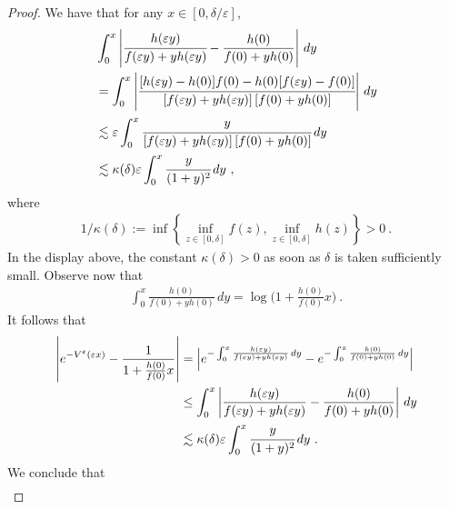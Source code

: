 \documentclass[reqno, 12pt, a4paper]{amsart}
\theoremstyle{plain}
\theoremstyle{definition}
\begin{document}
\begin{proof}
We have that for any $x \in [0,\delta/\varepsilon]$, 
\begin{equation}
\begin{split}
& \int_{0}^x \left\vert \cfrac{h(\varepsilon y)}{f(\varepsilon y) + y h(\varepsilon y)} - \frac{h(0)}{f(0)+y h(0)} \right\vert \, dy \\
&= \int_0^x \left\vert \cfrac{ [ h(\varepsilon y) -h(0)] f(0) - h(0) [ f(\varepsilon y) -f(0)] }{[ f(\varepsilon y) + y h(\varepsilon y)] \, [ f(0)+y h(0)] } \right\vert \, dy \\
& \lesssim \varepsilon  \int_0^x  \cfrac{y}{[ f(\varepsilon y) + y h(\varepsilon y)] \, [ f(0)+y h(0)] } \, dy \\
& \lesssim  \kappa (\delta) \varepsilon  \int_0^x  \cfrac{y}{(1+y)^2} \, dy \ ,
\end{split}
\end{equation}
where 
\begin{equation}
\begin{split}
1/ \kappa(\delta) := \inf\left\{ \inf_{z \in [0,\delta]} f(z) , \inf_{z \in [0,\delta]} h(z) \right\} > 0 \ .
\end{split}
\end{equation}
In the display above, the constant $\kappa (\delta)>0$ as soon as $\delta$ is taken sufficiently small. Observe now that
\begin{equation}
\begin{split}
\int_0^x \frac{h(0)}{f(0) + y h(0) } \, dy =  \log \Big( 1+\tfrac{h(0)}{f(0)} x \Big) \ .
\end{split}
\end{equation}
It follows that
\begin{equation}
\begin{split}
\left\vert e^{-V^\varepsilon (\varepsilon x)} - \frac{1}{1+\tfrac{h(0)}{f(0)} x} \right\vert & = \Big\vert e^{-\int_{0}^x \frac{h(\varepsilon y)}{f(\varepsilon y) + y h(\varepsilon y)} \, dy }  - e^{- \int_0^x \frac{h(0)}{f(0)+y h(0)} \, dy}  \Big\vert\\
& \le  \int_{0}^x \left\vert \frac{h(\varepsilon y)}{f(\varepsilon y) + y h(\varepsilon y)} - \frac{h(0)}{f(0)+y h(0)} \right\vert \, dy \\
& \lesssim  \kappa (\delta) \varepsilon  \int_0^x  \cfrac{y}{(1+y)^2} \, dy \ .
\end{split}
\end{equation}
We conclude that 
\begin{equation}
\begin{split}

\end{split}
\end{equation}
\end{proof}
\end{document}
